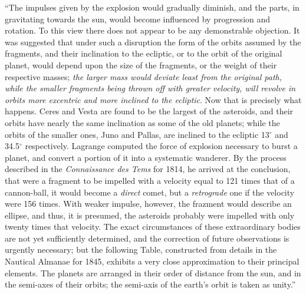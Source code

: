 \documentclass[a4paper, 12pt, oneside]{article}
\begin{document}
``The impulses given by the explosion would gradually diminish, and the parts, in gravitating towards the sun, would become influenced by progression and rotation. To this view there does not appear to be any demonstrable objection. It was suggested that under such a disruption the form of the orbits assumed by the fragments, and their inclination to the ecliptic, or to the orbit of the original planet, would depend upon the size of the fragments, or the weight of their respective masses; \emph{the larger mass would deviate least from the original path, while the smaller fragments being thrown off with greater velocity, will revolve in orbits more excentric and more inclined to the ecliptic}. Now that is precisely what happens. Ceres and Vesta are found to be the largest of the asteroids, and their orbits have nearly the same inclination as some of the old planets; while the orbits of the smaller ones, Juno and Pallas, are inclined to the ecliptic 13$^\circ$ and 34.5$^\circ$ respectively. Lagrange computed the force of explosion necessary to burst a planet, and convert a portion of it into a systematic wanderer. By the process described in the \emph{Connaissance des Tems} for 1814, he arrived at the conclusion, that were a fragment to be impelled with a velocity equal to 121 times that of a cannon-ball, it would become a \emph{direct} comet, but a \emph{retrograde} one if the velocity were 156 times. With weaker impulse, however, the frazment would describe an ellipse, and thus, it is presumed, the asteroids probably were impelled with only twenty times that velocity. The exact circumstances of these extraordinary bodies are not yet sufficiently determined, and the correction of future observations is urgently necessary; but the following Table, constructed from details in the Nautical Almanae for 1845, exhibits a very close approximation to their principal elements. The planets are arranged in their order of distance from the sun, and in the semi-axes of their orbits; the semi-axis of the earth's orbit is taken as unity.''
\end{document}
